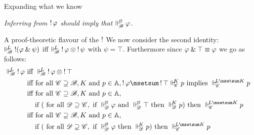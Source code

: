 \documentclass{beamer}
\begin{document}
\begin{frame}{Expanding what we know}
	\begin{center}
	\noindent
	\emph{Inferring from $\mathop{!} \varphi$ should imply that $\Vdash_{ \!\!\mathscr{B} }^{ \!\!\varnothing }\varphi$.}
	\end{center}
\end{frame}
\begin{frame}{A proof-theoretic flavour of the $\mathop{!}$}
	We now consider the second identity: $\Vdash_{ \!\!\mathscr{B} }^{ \!\!L }\mathop{!}(\varphi\mathbin{\&}\psi)$ iff $\Vdash_{ \!\!\mathscr{B} }^{ \!\!L }\mathop{!}\varphi \otimes \mathop{!}\psi$
	with $\psi = \top$. Furthermore since $\varphi\mathbin{\&}\top \equiv \varphi$ we go as follows:
	\begin{align*}
		\suppM{\baseB}{L}\bang\varphi &\text{ iff } \suppM{\baseB}{L}\bang\varphi \mand \bang\top \\
		&\text{ iff for all } \baseC\baseGeq\baseB, K \text{ and } p\in\At,\bang\varphi\msetsum\bang\top\suppM{\baseC}{K}p\text{ implies }\suppM{\baseC}{L\msetsum K}p\\
		&\text{ iff for all } \baseC\baseGeq\baseB, K \text{ and } p\in\At, \\
		&\hspace{0.4cm}\text{ if } (\text{ for all } \baseD\baseGeq\baseC,\text{ if }\suppM{\baseD}{\emptymultiset}\varphi\text{ and }\suppM{\baseD}{\emptymultiset}\top\text{ then }\suppM{\baseD}{K}p)\text{ then }\suppM{\baseC}{L\msetsum K}p\\
		&\text{ iff for all } \baseC\baseGeq\baseB, K \text{ and } p\in\At, \\
		&\hspace{0.4cm}\text{ if } (\text{ for all }  \baseD\baseGeq\baseC,\text{ if }\suppM{\baseD}{\emptymultiset}\varphi\text{ then }\suppM{\baseD}{K}p)\text{ then }\suppM{\baseC}{L\msetsum K}p
	\end{align*}
\end{frame}
	
	
\end{document}
